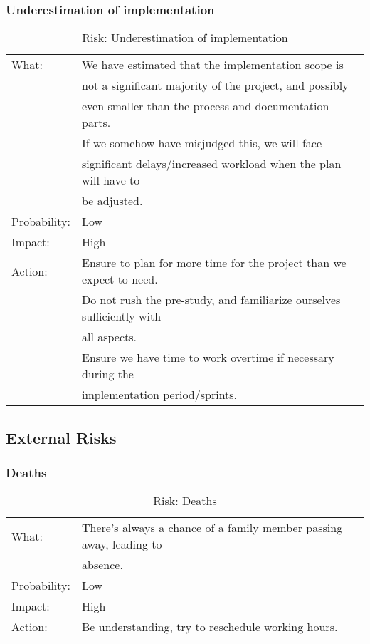\subsubsection{Underestimation of implementation}
\begin{table}[H]
\begin{tabular}{| l | l |}
	\hline
	What: & We have estimated that the implementation scope is \\
	&not a significant majority of the project, and possibly \\
	&even smaller than the process and documentation parts. \\
	& If we somehow have misjudged this, we will face \\
	& significant delays/increased workload when the plan will have to\\
	& be adjusted.\\
	\hline
	Probability: & Low \\
	\hline
	Impact: & High \\
	\hline
	Action: & Ensure to plan for more time for the project than we expect to need.\\
	& Do not rush the pre-study, and familiarize ourselves sufficiently with\\
	& all aspects.\\
	& Ensure we have time to work overtime if necessary during the\\
	& implementation period/sprints.\\
	\hline
\end{tabular}
\caption{Risk: Underestimation of implementation}
\end{table}

\subsection{External Risks}
\subsubsection{Deaths}
\begin{table}[H]
\begin{tabular}{| l | l |}
	\hline
	What: & There's always a chance of a family member passing away, leading to\\
	& absence.\\
	\hline
	Probability: & Low \\
	\hline
	Impact: & High \\
	\hline
	Action: & Be understanding, try to reschedule working hours.\\
	\hline
\end{tabular}
\caption{Risk: Deaths}
\end{table}


